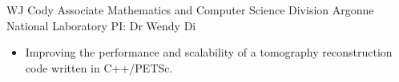 
        {WJ Cody Associate}
        {\newline Mathematics and Computer Science Division}
        {Argonne National Laboratory}
        {PI: Dr Wendy Di}{
    \begin{itemize}
		\item Improving the performance and scalability of a tomography reconstruction code  written in C++/PETSc.
    \end{itemize}
	}


